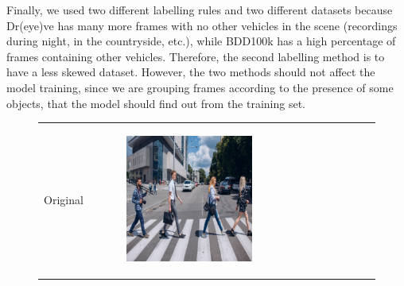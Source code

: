 Finally, we used two different labelling rules and two different datasets because 
Dr(eye)ve has many more frames with no other vehicles in the scene (recordings 
during night, in the countryside, etc.), while BDD100k has a high percentage of 
frames containing other vehicles. Therefore, the second labelling method is to 
have a less skewed dataset.
However, the two methods should not affect the model training, since we are 
grouping frames according to the presence of some objects, that the model should 
find out from the training set.
%
\newlength{\subfigwidth}
\setlength{\subfigwidth}{32mm}
\newlength{\horspace}
\setlength{\horspace}{.25\textwidth}
\begin{figure}
    \caption{Attention masks for a pre-trained multi-head ViT \cite{attention_vit}.}
    \centering
    \begin{tabular}{r p{\horspace} p{\horspace} p{\horspace}}
    Original & 
    \begin{subfigure}[b]{\subfigwidth}
        \includegraphics[width=\subfigwidth]{images/vit_attention/1/img.png}
    \end{subfigure}
    \hfill &
    \begin{subfigure}[b]{\subfigwidth}

\end{subfigure}
\end{tabular}
\end{figure}
